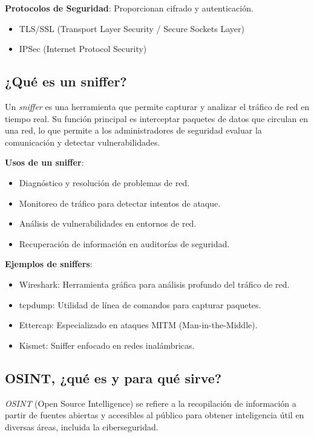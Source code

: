 \textbf{Protocolos de Seguridad}: Proporcionan cifrado y autenticación.
\begin{itemize}
    \item TLS/SSL (Transport Layer Security / Secure Sockets Layer)
    \item IPSec (Internet Protocol Security)
\end{itemize}

\subsection{¿Qué es un sniffer?}
Un \textit{sniffer} es una herramienta que permite capturar y analizar el tráfico de red en tiempo real. Su función principal es interceptar paquetes de datos que circulan en una red, lo que permite a los administradores de seguridad evaluar la comunicación y detectar vulnerabilidades.

\textbf{Usos de un sniffer}:
\begin{itemize}
    \item Diagnóstico y resolución de problemas de red.
    \item Monitoreo de tráfico para detectar intentos de ataque.
    \item Análisis de vulnerabilidades en entornos de red.
    \item Recuperación de información en auditorías de seguridad.
\end{itemize}

\textbf{Ejemplos de sniffers}:
\begin{itemize}
    \item Wireshark: Herramienta gráfica para análisis profundo del tráfico de red.
    \item tcpdump: Utilidad de línea de comandos para capturar paquetes.
    \item Ettercap: Especializado en ataques MITM (Man-in-the-Middle).
    \item Kismet: Sniffer enfocado en redes inalámbricas.
\end{itemize}

\subsection{OSINT, ¿qué es y para qué sirve?}
\textit{OSINT} (Open Source Intelligence) se refiere a la recopilación de información a partir de fuentes abiertas y accesibles al público para obtener inteligencia útil en diversas áreas, incluida la ciberseguridad.

